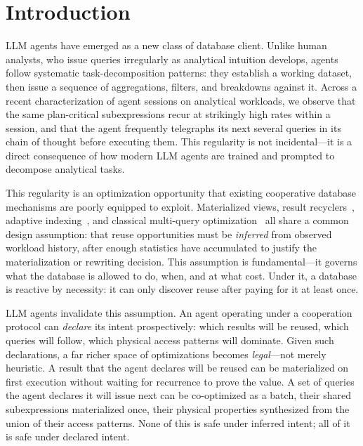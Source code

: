 \section{Introduction}
\label{sec:intro}

LLM agents have emerged as a new class of database client. Unlike human analysts, who issue queries irregularly as analytical intuition develops, agents follow systematic task-decomposition patterns: they establish a working dataset, then issue a sequence of aggregations, filters, and breakdowns against it. Across a recent characterization of agent sessions on analytical workloads, we observe that the same plan-critical subexpressions recur at strikingly high rates within a session, and that the agent frequently telegraphs its next several queries in its chain of thought before executing them. This regularity is not incidental---it is a direct consequence of how modern LLM agents are trained and prompted to decompose analytical tasks.

This regularity is an optimization opportunity that existing cooperative database mechanisms are poorly equipped to exploit. Materialized views, result recyclers~\cite{ivanova2010recycler}, adaptive indexing~\cite{idreos2007cracking}, and classical multi-query optimization~\cite{sellis1988mqo,roy2000mqo} all share a common design assumption: that reuse opportunities must be \emph{inferred} from observed workload history, after enough statistics have accumulated to justify the materialization or rewriting decision. This assumption is fundamental---it governs what the database is allowed to do, when, and at what cost. Under it, a database is reactive by necessity: it can only discover reuse after paying for it at least once.

LLM agents invalidate this assumption. An agent operating under a cooperation protocol can \emph{declare} its intent prospectively: which results will be reused, which queries will follow, which physical access patterns will dominate. Given such declarations, a far richer space of optimizations becomes \emph{legal}---not merely heuristic. A result that the agent declares will be reused can be materialized on first execution without waiting for recurrence to prove the value. A set of queries the agent declares it will issue next can be co-optimized as a batch, their shared subexpressions materialized once, their physical properties synthesized from the union of their access patterns. None of this is safe under inferred intent; all of it is safe under declared intent.

